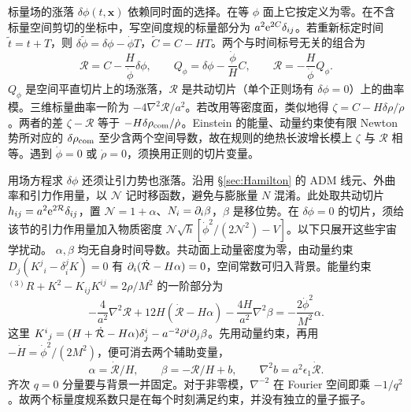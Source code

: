 标量场的涨落 $\delta\phi(t,\bm x)$ 依赖同时面的选择。在等 $\phi$ 面上它按定义为零。在不含标量空间剪切的坐标中，写空间度规的标量部分为 $a^2\mathrm{e}^{2C}\delta_{ij}$。若重新标定时间 $\widetilde t=t+T$，则 $\delta\widetilde\phi=\delta\phi-\dot\phi T$，$\widetilde C=C-HT$。两个与时间标号无关的组合为
\begin{equation}\label{eq:cosmo-inf-RQ}
 \mathcal R=C-\frac{H}{\dot\phi}\delta\phi,\qquad
 Q_\phi=\delta\phi-\frac{\dot\phi}{H}C,\qquad
 \mathcal R=-\frac{H}{\dot\phi}Q_\phi .
\end{equation}
$Q_\phi$ 是空间平直切片上的场涨落，$\mathcal R$ 是共动切片（单个正则场有 $\delta\phi=0$）上的曲率模。三维标量曲率一阶为 $-4\nabla^2\mathcal R/a^2$。若改用等密度面，类似地得 $\zeta=C-H\delta\rho/\dot\rho$。两者的差 $\zeta-\mathcal R$ 等于 $-H\delta\rho_{\rm com}/\dot\rho$。Einstein 的能量、动量约束使有限 Newton 势所对应的 $\delta\rho_{\rm com}$ 至少含两个空间导数，故在规则的绝热长波增长模上 $\zeta$ 与 $\mathcal R$ 相等。遇到 $\dot\phi=0$ 或 $\dot\rho=0$，须换用正则的切片变量。

用场方程求 $\delta\phi$ 还须让引力势也涨落。沿用 \S\ref{sec:Hamilton} 的 ADM 线元、外曲率和引力作用量，以 $\mathcal N$ 记时移函数，避免与膨胀量 $N$ 混淆。此处取共动切片 $h_{ij}=a^2\mathrm{e}^{2\mathcal R}\delta_{ij}$，置 $\mathcal N=1+\alpha$、$N_i=\partial_i\beta$，$\beta$ 是移位势。在 $\delta\phi=0$ 的切片，须给该节的引力作用量加入物质密度 $\mathcal N\sqrt h[\dot\phi^2/(2\mathcal N^2)-V]$。以下只展开这些宇宙学扰动。
$\alpha,\beta$ 均无自身时间导数。共动面上动量密度为零，由动量约束 $D_j(K^j{}_i-\delta^j_i K)=0$ 有 $\partial_i(\dot{\mathcal R}-H\alpha)=0$，空间常数可归入背景。能量约束 $ {}^{(3)}R+K^2-K_{ij}K^{ij}=2\rho/M^2$ 的一阶部分为
\[
 -\frac4{a^2}\nabla^2\mathcal R
 +12H(\dot{\mathcal R}-H\alpha)-\frac{4H}{a^2}\nabla^2\beta
 =-\frac{2\dot\phi^2}{M^2}\alpha .
\]
这里 $K^i{}_j=(H+\dot{\mathcal R}-H\alpha)\delta^i_j-a^{-2}\partial^i\partial_j\beta$。先用动量约束，再用 $-\dot H=\dot\phi^2/(2M^2)$，便可消去两个辅助变量，
\begin{equation}\label{eq:cosmo-inf-shift}
 \alpha=\dot{\mathcal R}/H,\qquad
 \beta=-\mathcal R/H+b,\qquad
 \nabla^2 b=a^2\epsilon_1\dot{\mathcal R}.
\end{equation}
齐次 $q=0$ 分量要与背景一并固定。对于非零模，$\nabla^{-2}$ 在 Fourier 空间即乘 $-1/q^2$。故两个标量度规系数只是在每个时刻满足约束，并没有独立的量子振子。

